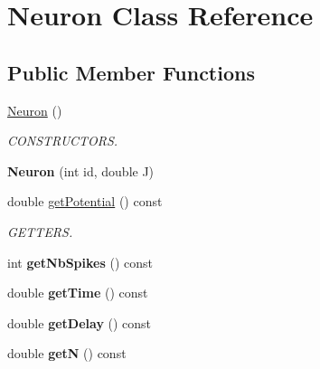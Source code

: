 \hypertarget{classNeuron}{\section{Neuron Class Reference}
\label{classNeuron}
}
\subsection*{Public Member Functions}
\begin{DoxyCompactItemize}
\item 
\hypertarget{classNeuron_a823487d01615fadb8ac19a2768dd9d96}{\hyperlink{classNeuron_a823487d01615fadb8ac19a2768dd9d96}{Neuron} ()}\label{classNeuron_a823487d01615fadb8ac19a2768dd9d96}

\begin{DoxyCompactList}\small\item\em C\-O\-N\-S\-T\-R\-U\-C\-T\-O\-R\-S. \end{DoxyCompactList}\item 
\hypertarget{classNeuron_ad8dac9eb60859d3f3e4fc8ed22d9986e}{{\bfseries Neuron} (int id, double J)}\label{classNeuron_ad8dac9eb60859d3f3e4fc8ed22d9986e}

\item 
\hypertarget{classNeuron_ae2bc004a58621da0d1c51591400ca87d}{double \hyperlink{classNeuron_ae2bc004a58621da0d1c51591400ca87d}{get\-Potential} () const }\label{classNeuron_ae2bc004a58621da0d1c51591400ca87d}

\begin{DoxyCompactList}\small\item\em G\-E\-T\-T\-E\-R\-S. \end{DoxyCompactList}\item 
\hypertarget{classNeuron_ab1efa405eb0cd7bac6ca012c961efe5d}{int {\bfseries get\-Nb\-Spikes} () const }\label{classNeuron_ab1efa405eb0cd7bac6ca012c961efe5d}

\item 
\hypertarget{classNeuron_ac8dde0507fc46ac92f9a6d7d8843bfd4}{double {\bfseries get\-Time} () const }\label{classNeuron_ac8dde0507fc46ac92f9a6d7d8843bfd4}

\item 
\hypertarget{classNeuron_ad87cfbd4f9f22155180692a2743a3618}{double {\bfseries get\-Delay} () const }\label{classNeuron_ad87cfbd4f9f22155180692a2743a3618}

\item 
\hypertarget{classNeuron_afde89d9c6e759c4cc0f42b39aeec5da3}{double {\bfseries get\-N} () const }\label{classNeuron_afde89d9c6e759c4cc0f42b39aeec5da3}


\end{DoxyCompactItemize}
